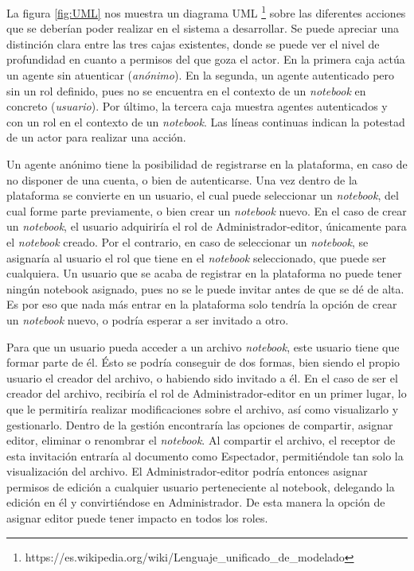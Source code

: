 \documentclass[11pt,spanish,listoffigures]{tfgetsinf}
\begin{document}
La figura \ref{fig:UML} nos muestra un diagrama UML \footnote{https://es.wikipedia.org/wiki/Lenguaje\_unificado\_de\_modelado} sobre las diferentes acciones que se deberían poder realizar en el sistema a desarrollar. Se puede apreciar una distinción clara entre las tres cajas existentes, donde se puede ver el nivel de profundidad en cuanto a permisos del que goza el actor. En la primera caja actúa un agente sin atuenticar (\textit{anónimo}). En la segunda, un agente autenticado pero sin un rol definido, pues no se encuentra en el contexto de un \textit{notebook} en concreto (\textit{usuario}). Por último, la tercera caja muestra agentes autenticados y con un rol en el contexto de un \textit{notebook}.  Las líneas continuas indican la potestad de un actor para realizar una acción.

Un agente anónimo tiene la posibilidad de registrarse en la plataforma, en caso de no disponer de una cuenta, o bien de autenticarse. Una vez dentro de la plataforma se convierte en un usuario, el cual puede seleccionar un \textit{notebook}, del cual forme parte previamente, o bien crear un \textit{notebook} nuevo. En el caso de crear un \textit{notebook}, el usuario adquiriría el rol de Administrador-editor, únicamente para el \textit{notebook} creado. Por el contrario, en caso de seleccionar un \textit{notebook}, se asignaría al usuario el rol que tiene en el \textit{notebook} seleccionado, que puede ser cualquiera. Un usuario que se acaba de registrar en la plataforma no puede tener ningún notebook asignado, pues no se le puede invitar antes de que se dé de alta. Es por eso que nada más entrar en la plataforma solo tendría la opción de crear un \textit{notebook} nuevo, o podría esperar a ser invitado a otro.

Para que un usuario pueda acceder a un archivo \textit{notebook}, este usuario tiene que formar parte de él. Ésto se podría conseguir de dos formas, bien siendo el propio usuario el creador del archivo, o habiendo sido invitado a él. En el caso de ser el creador del archivo, recibiría el rol de Administrador-editor en un primer lugar, lo que le permitiría realizar modificaciones sobre el archivo, así como visualizarlo y gestionarlo. Dentro de la gestión encontraría las opciones de compartir, asignar editor, eliminar o renombrar el \textit{notebook}. Al compartir el archivo, el receptor de esta invitación entraría al documento como Espectador, permitiéndole tan solo la visualización del archivo. El Administrador-editor podría entonces asignar permisos de edición a cualquier usuario perteneciente al notebook, delegando la edición en él y convirtiéndose en Administrador. De esta manera la opción de asignar editor puede tener impacto en todos los roles.
\end{document}
